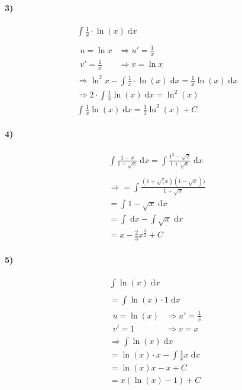 \paragraph{3)}

\begin{align*}
    &\int \frac{1}{x} \cdot \ln(x) \;\mathrm{d}x \\
    \\
    &\begin{array}{ll}
        u = \ln x &\Rightarrow u'= \frac{1}{x} \\
        v' = \frac{1}{x} &\Rightarrow v = \ln x 
    \end{array} \\
    &\Rightarrow{} \ln^2 x- \int\frac{1}{x} \cdot \ln(x) \;\mathrm{d}x = \frac{1}{x} \ln(x) \;\mathrm{d}x \\
    &\Rightarrow{} 2 \cdot \int\frac{1}{x} \ln(x) \;\mathrm{d}x = \ln^2(x) \\
    &\int\frac{1}{x} \ln(x) \;\mathrm{d}x = \frac{1}{2} \ln^2 (x) + C
\end{align*}

\paragraph{4)}

\begin{align*}
    &\int \frac{1-x}{1+\sqrt{x}} \;\mathrm{d}x = \int \frac{1^2 - \sqrt{2}}{1+ \sqrt{x}} \;\mathrm{d}x \\
    \\
    &\Rightarrow = \int \frac{(1 + \sqrt(x) (1 - \sqrt{x}))}{1 + \sqrt{x}} \\
    &= \int 1 - \sqrt{x} \;\mathrm{d}x \\
    &= \int \;\mathrm{d}x - \int \sqrt{x} \;\mathrm{d}x \\
    &= x - \frac{2}{3} x^{\frac{3}{2}} + C     
\end{align*}

\paragraph{5)}

\begin{align*}
    &\int \ln(x) \;\mathrm{d}x \\
    \\
    &= \int \ln(x) \cdot 1 \;\mathrm{d}x \\
    &\begin{array}{ll}
        u = \ln(x) &\Rightarrow u' = \frac{1}{x} \\
        v' = 1 &\Rightarrow v = x
    \end{array} \\
    &\Rightarrow\int\ln(x) \;\mathrm{d}x \\
    &= \ln(x) \cdot x- \int\frac{1}{x} x \;\mathrm{d}x \\
    &= \ln(x) x-x+C \\
    &= x (\ln(x)-1) +C
\end{align*}

